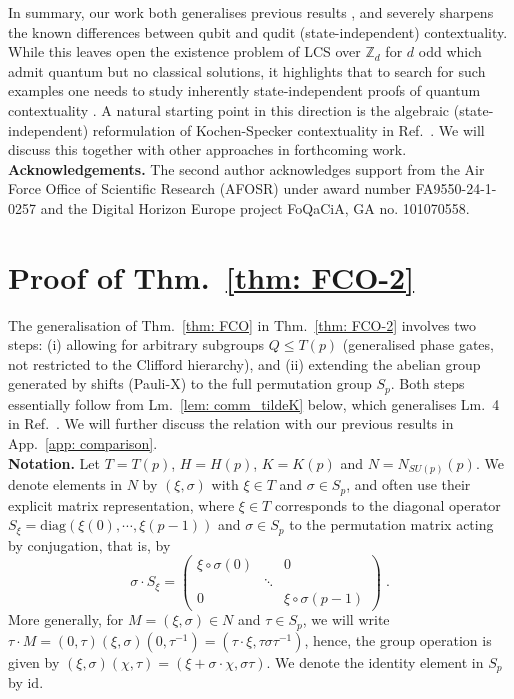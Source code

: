 \documentclass[aps,pra,letterpaper,onrcolumn,nofootinbib,notitlepage,longbibliography]{revtex4-1}
\newcommand{\mf}[1]{#1}
\newcommand{\id}{\mathrm{id}}
\newcommand{\zz}{\mathbb Z}
\begin{document}
In summary, our work both generalises previous results \cite{QassimWallman2020,FrembsChungOkay2022}, and severely sharpens the known differences between qubit and qudit (state-independent) contextuality. While this leaves open the existence problem of LCS over $\zz_d$ for $d$ odd which admit quantum but no classical solutions, it highlights that to search for such examples one needs to study inherently state-independent proofs of quantum contextuality \cite{KochenSpecker1967}. A natural starting point in this direction is the algebraic (state-independent) reformulation of Kochen-Specker contextuality in Ref.~\cite{Frembs2024,Frembs2025}. \mf{We will discuss this together with other approaches in forthcoming work.}\\


\textbf{Acknowledgements.}
The second author acknowledges support from the Air Force Office of Scientific Research (AFOSR) under award number FA9550-24-1-0257 and the Digital Horizon Europe project FoQaCiA, GA no. 101070558.






\appendix

\section{Proof of Thm.~\ref{thm: FCO-2}}\label{app: proof of main theorem}

The generalisation of Thm.~\ref{thm: FCO} in Thm.~\ref{thm: FCO-2} involves two steps: (i) allowing for arbitrary subgroups $Q\leq T(p)$ (generalised phase gates, not restricted to the Clifford hierarchy), and (ii) extending the abelian group generated by shifts (Pauli-X) to the full permutation group $S_p$. Both steps essentially follow from Lm.~\ref{lem: comm_tildeK} below, which generalises Lm.~4 in Ref.~\cite{FrembsChungOkay2022}. We will further discuss the relation with our previous results in App.~\ref{app: comparison}.\\

\textbf{Notation.} Let $T=T(p)$, $H=H(p)$, $K=K(p)$ and $N=N_{SU(p)}(p)$. We denote elements in $N$ by $(\xi,\sigma)$ with $\xi\in T$ and $\sigma\in S_p$, and often use their explicit matrix representation, where $\xi\in T$ corresponds to the diagonal operator $S_\xi=\mathrm{diag}\mf{(\xi(0),\cdots,\xi(p-1))}$ and $\sigma\in S_p$ to the permutation matrix acting by conjugation, that is, by
$$\sigma\cdot S_\xi=\begin{pmatrix}\xi\circ \sigma(0) & &0\\ & \ddots & \\ 0& & \xi\circ\sigma(p-1)\end{pmatrix}\; .$$
More generally, for $M=(\xi,\sigma)\in N$ and $\tau\in S_p$, we will write
$\tau\cdot M=(0,\tau)(\xi,\sigma)(0,\tau^{-1})=(\tau\cdot\xi,\tau\sigma\tau^{-1})$, hence, the group operation is given by $(\xi,\sigma)(\chi,\tau)=(\xi+\sigma\cdot\chi,\sigma\tau)$. We denote the identity element in $S_p$ by $\id$.
\end{document}

